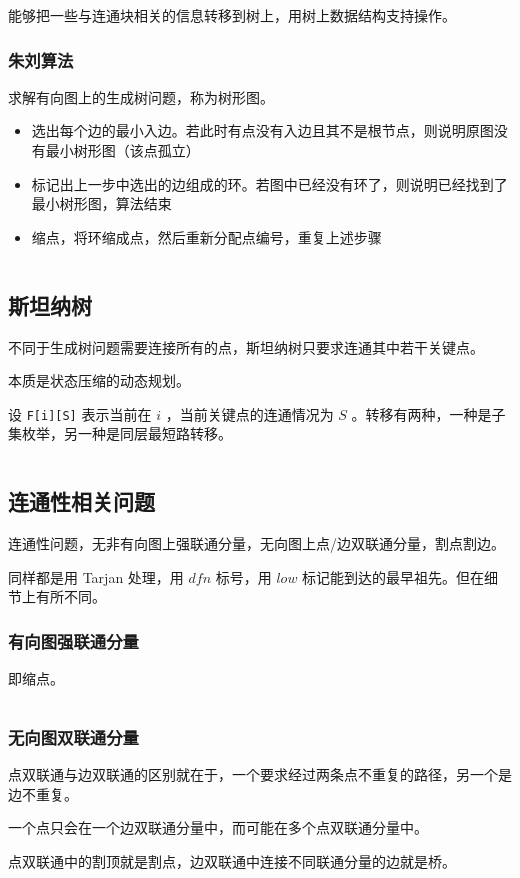 \documentclass[UTF-8]{ctexart}
\newcommand{\cpp}[1]{\inputminted[bgcolor=bg,breaklines,breakanywhere=true]{c++}{#1}}
\begin{document}
			能够把一些与连通块相关的信息转移到树上，用树上数据结构支持操作。
			\subsubsection{朱刘算法}
			求解有向图上的生成树问题，称为树形图。
			\begin{itemize}
				\item 选出每个边的最小入边。若此时有点没有入边且其不是根节点，则说明原图没有最小树形图（该点孤立）
				\item 标记出上一步中选出的边组成的环。若图中已经没有环了，则说明已经找到了最小树形图，算法结束
				\item 缩点，将环缩成点，然后重新分配点编号，重复上述步骤
			\end{itemize}
			\cpp{code//Graph//mdst.cpp}
			\subsection{斯坦纳树}
			不同于生成树问题需要连接所有的点，斯坦纳树只要求连通其中若干关键点。
			
			本质是状态压缩的动态规划。
			
			设 \texttt{F[i][S]} 表示当前在 $i$ ，当前关键点的连通情况为 $S$ 。转移有两种，一种是子集枚举，另一种是同层最短路转移。
			
			\cpp{code//Graph//smt.cpp}
			\subsection{连通性相关问题}
			连通性问题，无非有向图上强联通分量，无向图上点/边双联通分量，割点割边。
			
			同样都是用 Tarjan 处理，用 $dfn$ 标号，用 $low$ 标记能到达的最早祖先。但在细节上有所不同。
				\subsubsection{有向图强联通分量}
				即缩点。
				\cpp{code//Graph//tarjan-direct.cpp}
				\subsubsection{无向图双联通分量}
				点双联通与边双联通的区别就在于，一个要求经过两条点不重复的路径，另一个是边不重复。
				
				一个点只会在一个边双联通分量中，而可能在多个点双联通分量中。
				
				点双联通中的割顶就是割点，边双联通中连接不同联通分量的边就是桥。
				\cpp{code//Graph//tarjan-undirect.cpp}
\end{document}
